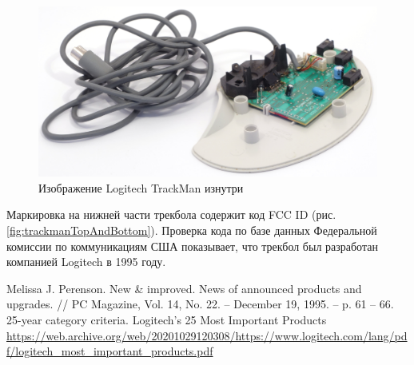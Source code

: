 \documentclass[11pt, a4paper]{article}
\begin{document}
\begin{figure}[h]
    \centering
    \includegraphics[scale=0.6]{1995_logitech_trackman/inside_30.jpg}
    \caption{Изображение Logitech TrackMan изнутри}
    \label{fig:trackmanInside}
\end{figure}

Маркировка на нижней части трекбола содержит код FCC ID (рис. \ref{fig:trackmanTopAndBottom}).
Проверка кода по базе данных Федеральной комиссии по коммуникациям США показывает, что трекбол был разработан компанией Logitech в 1995 году.


\begin{thebibliography}{9}
 Melissa J. Perenson. New \& improved. News of announced products and upgrades. // PC Magazine, Vol. 14, No. 22. -- December 19, 1995. -- p. 61 -- 66.
 25-year category criteria. Logitech’s 25 Most Important Products \url{https://web.archive.org/web/20201029120308/https://www.logitech.com/lang/pdf/logitech_most_important_products.pdf}
\end{thebibliography}
\end{document}
